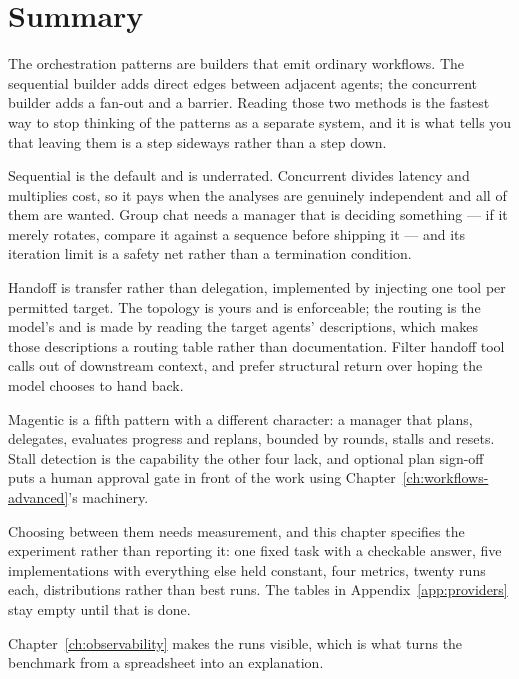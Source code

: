 \section{Summary}

The orchestration patterns are builders that emit ordinary workflows. The
sequential builder adds direct edges between adjacent agents; the concurrent
builder adds a fan-out and a barrier. Reading those two  methods is
the fastest way to stop thinking of the patterns as a separate system, and it is
what tells you that leaving them is a step sideways rather than a step down.

Sequential is the default and is underrated. Concurrent divides latency and
multiplies cost, so it pays when the analyses are genuinely independent and all
of them are wanted. Group chat needs a manager that is deciding something --- if
it merely rotates, compare it against a sequence before shipping it --- and its
iteration limit is a safety net rather than a termination condition.

Handoff is transfer rather than delegation, implemented by injecting one tool per
permitted target. The topology is yours and is enforceable; the routing is the
model's and is made by reading the target agents' descriptions, which makes those
descriptions a routing table rather than documentation. Filter handoff tool calls
out of downstream context, and prefer structural return over hoping the model
chooses to hand back.

Magentic is a fifth pattern with a different character: a manager that plans,
delegates, evaluates progress and replans, bounded by rounds, stalls and resets.
Stall detection is the capability the other four lack, and optional plan sign-off
puts a human approval gate in front of the work using
Chapter~\ref{ch:workflows-advanced}'s machinery.

Choosing between them needs measurement, and this chapter specifies the
experiment rather than reporting it: one fixed task with a checkable answer, five
implementations with everything else held constant, four metrics, twenty runs
each, distributions rather than best runs. The tables in
Appendix~\ref{app:providers} stay empty until that is done.

Chapter~\ref{ch:observability} makes the runs visible, which is what turns the
benchmark from a spreadsheet into an explanation.
